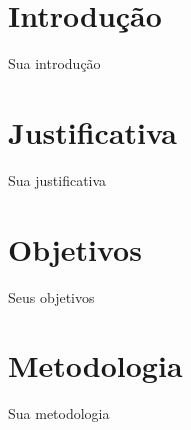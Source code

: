 \documentclass[article,12pt, a4paper]{abntex2}
\begin{document}
	
%			
		
		
		
	

%
%
%
%
%
\imprimircapa
\textual
\section{Introdução}

Sua introdução

\section{Justificativa}
Sua justificativa
\section{Objetivos}
Seus objetivos
 
\section{Metodologia}
Sua metodologia
   
\end{document}

